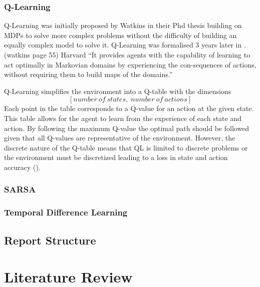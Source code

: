 \documentclass[10pt,journal]{IEEEtran}
\begin{document}
\subsubsection{Q-Learning}
Q-Learning was initially proposed by Watkins in their Phd thesis \cite{Watkins89} building on MDPs to solve more complex problems without the difficulty of building an equally complex model to solve it. Q-Learning was formalised 3 years later in \cite{Watkins}. (watkins page 55) Harvard
“It provides  agents with the capability of learning to act optimally in Markovian domains by experiencing the con-sequences of actions, without requiring them to build maps of the domains.”

Q-Learning simplifies the environment into a Q-table with the dimensions $$[number \: of \: states, \; number \: of \: actions]$$ Each point in the table corresponds to a Q-value for an action at the given state. This table allows for the agent to learn from the experience of each state and action. By following the maximum Q-value the optimal path should be followed given that all Q-values are representative of the environment. However, the discrete nature of the Q-table means that QL is limited to discrete problems or the environment must be discretized leading to a loss in state and action accuracy (\cite{Gaskett}). 

\subsubsection{SARSA}

\subsubsection{Temporal Difference Learning}

\subsection{Report Structure}

\tableofcontents{}

\section{Literature Review}
\end{document}
